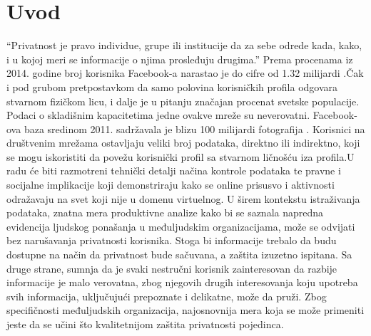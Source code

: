 \documentclass[a4paper]{article}
\begin{document}
\section{Uvod}
\large
\label{sec:uvod}
“Privatnost je pravo individue, grupe ili institucije da za sebe odrede kada, kako, i u kojoj meri se informacije o njima prosleđuju drugima.”\cite{Privacy and Freedom} \newline Prema procenama iz 2014. godine broj korisnika Facebook-a narastao je do cifre od 1.32 milijardi \cite{1.32}.Čak i pod grubom
pretpostavkom da samo polovina korisničkih profila odgovara stvarnom fizičkom licu, i dalje je u pitanju značajan procenat svetske populacije. Podaci o skladišnim kapacitetima jedne ovakve mreže su neverovatni. Facebook-ova baza sredinom 2011. sadržavala je blizu 100 milijardi fotografija \cite{photetrends}. Korisnici na društvenim mrežama ostavljaju veliki broj podataka, direktno ili indirektno, koji se mogu iskoristiti da povežu korisnički profil sa stvarnom ličnošću iza profila.U radu će biti razmotreni tehnički detalji načina kontrole podataka te pravne i socijalne implikacije koji demonstriraju kako se online prisusvo i aktivnosti odražavaju na svet koji nije u domenu virtuelnog.
U širem kontekstu istraživanja podataka, znatna mera produktivne analize kako bi se saznala napredna evidencija ljudskog ponašanja u međuljudskim organizacijama, može se odvijati bez narušavanja privatnosti korisnika. Stoga bi informacije trebalo da budu dostupne na način da privatnost bude sačuvana, a zaštita izuzetno ispitana. Sa druge strane, sumnja da je svaki nestručni korisnik zainteresovan da razbije informacije je malo verovatna, zbog njegovih drugih interesovanja  koju upotreba svih informacija, uključujući prepoznate i delikatne, može da pruži. Zbog specifičnosti međuljudskih organizacija, najosnovnija mera koja se može primeniti jeste da se učini što kvalitetnijom zaštita privatnosti pojedinca.

\newpage
\end{document}
